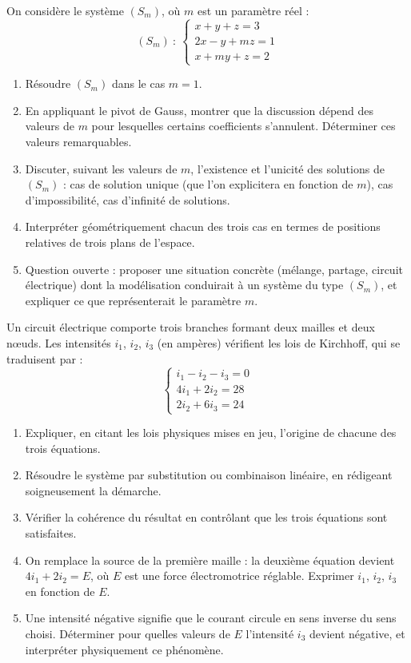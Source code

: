 \documentclass[11pt]{article}
\begin{document}
\begin{exercice}
On considère le système $(S_m)$, où $m$ est un paramètre réel :
\[
(S_m)\ :\ 
\begin{cases}
x + y + z = 3 \\
2x - y + mz = 1 \\
x + my + z = 2
\end{cases}
\]

\begin{enumerate}
\item Résoudre $(S_m)$ dans le cas $m = 1$.
\item En appliquant le pivot de Gauss, montrer que la discussion dépend des valeurs de $m$ pour lesquelles certains coefficients s'annulent. Déterminer ces valeurs remarquables.
\item Discuter, suivant les valeurs de $m$, l'existence et l'unicité des solutions de $(S_m)$ : cas de solution unique (que l'on explicitera en fonction de $m$), cas d'impossibilité, cas d'infinité de solutions.
\item Interpréter géométriquement chacun des trois cas en termes de positions relatives de trois plans de l'espace.
\item Question ouverte : proposer une situation concrète (mélange, partage, circuit électrique) dont la modélisation conduirait à un système du type $(S_m)$, et expliquer ce que représenterait le paramètre $m$.
\end{enumerate}
\end{exercice}

\begin{exercice}
Un circuit électrique comporte trois branches formant deux mailles et deux nœuds. Les intensités $i_1$, $i_2$, $i_3$ (en ampères) vérifient les lois de Kirchhoff, qui se traduisent par :
\[
\begin{cases}
i_1 - i_2 - i_3 = 0 \\
4i_1 + 2i_2 = 28 \\
2i_2 + 6i_3 = 24
\end{cases}
\]

\begin{enumerate}
\item Expliquer, en citant les lois physiques mises en jeu, l'origine de chacune des trois équations.
\item Résoudre le système par substitution ou combinaison linéaire, en rédigeant soigneusement la démarche.
\item Vérifier la cohérence du résultat en contrôlant que les trois équations sont satisfaites.
\item On remplace la source de la première maille : la deuxième équation devient $4i_1 + 2i_2 = E$, où $E$ est une force électromotrice réglable. Exprimer $i_1$, $i_2$, $i_3$ en fonction de $E$.
\item Une intensité négative signifie que le courant circule en sens inverse du sens choisi. Déterminer pour quelles valeurs de $E$ l'intensité $i_3$ devient négative, et interpréter physiquement ce phénomène.
\end{enumerate}
\end{exercice}
\end{document}
